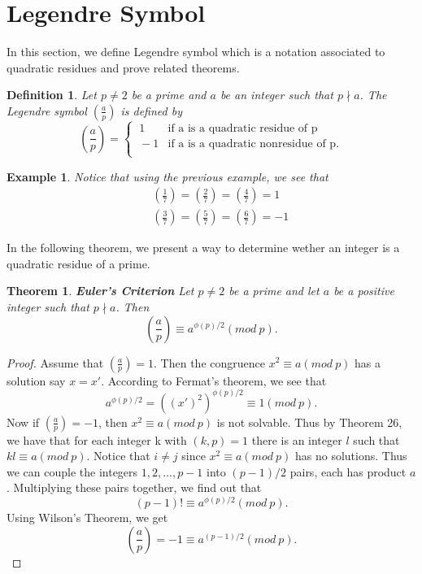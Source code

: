 \documentclass[12pt,letterpaper]{book}
\newtheorem{theorem}{Theorem}
\newtheorem{def1}{Definition}
\newtheorem{example}{Example}
\begin{document}
\newpage

\section{Legendre Symbol}
In this section, we define Legendre symbol which is a notation
associated to quadratic residues and prove related theorems.
\begin{def1}
Let $p\neq 2$ be a prime and $a$ be an integer such that $p\nmid a$.
The Legendre symbol $\left(\frac{a}{p}\right)$ is defined by
\[\left(\frac{a}{p}\right)=\left\{\begin{array}{lcr}
\ 1  &\mbox{if a is a quadratic residue of p} \\
\ -1  &\mbox{if a is a quadratic nonresidue of p}. \\
\end{array}\right .\]
\end{def1}

\begin{example}
Notice that using the previous example, we see that
\begin{eqnarray*}
&&
\left(\frac{1}{7}\right)=\left(\frac{2}{7}\right)=\left(\frac{4}{7}\right)=1\\
&&
\left(\frac{3}{7}\right)=\left(\frac{5}{7}\right)=\left(\frac{6}{7}\right)=-1
\end{eqnarray*}
\end{example}
 In the following theorem, we present a way
to determine wether an integer is a quadratic residue of a prime.
\begin{theorem}\textbf{Euler's Criterion}
Let $p\neq 2$ be a prime and let $a$ be a positive integer such that
$p\nmid a$. Then
\begin{equation*}
\left(\frac{a}{p}\right)\equiv a^{\phi(p)/2}(mod \ p).
\end{equation*}
\end{theorem}

\begin{proof}
Assume that $\left(\frac{a}{p}\right)=1$.  Then the congruence
$x^2\equiv a(mod \ p)$ has a solution say $x=x'$.  According to
Fermat's theorem, we see that
\begin{equation*}
a^{\phi(p)/2}=((x')^2)^{\phi(p)/2}\equiv 1(mod\ p).
\end{equation*}
Now if $\left(\frac{a}{p}\right)=-1$, then $x^2\equiv a(mod \ p)$ is
not solvable. Thus by Theorem 26, we have that for each integer k
with $(k,p)=1$ there is an integer $l$ such that $kl\equiv a(mod \
p)$. Notice that $i\neq j$ since $x^2\equiv a(mod \ p)$ has no
solutions. Thus we can couple the integers $1,2,...,p-1$ into
$(p-1)/2$ pairs, each has product $a$. Multiplying these pairs
together, we find out that
\begin{equation*}
(p-1)!\equiv a^{\phi(p)/2}(mod \ p).
\end{equation*}
Using Wilson's Theorem, we get
\begin{equation*}
\left(\frac{a}{p}\right)=-1\equiv a^{(p-1)/2}(mod \ p).
\end{equation*}
\end{proof}
\end{document}
